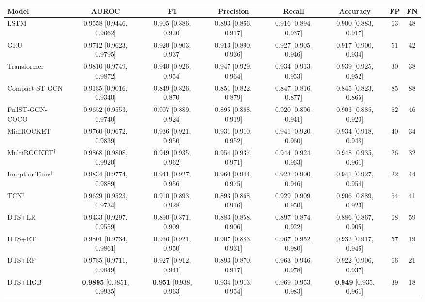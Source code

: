 \begin{table}[t]
\centering
\small
\setlength{\tabcolsep}{1.8pt}
\begin{tabular}{lccccccc}
\toprule
Model & AUROC & F1 & Precision & Recall & Accuracy & FP & FN \\
\midrule
LSTM & 0.9558 [0.9446, 0.9662] & 0.905 [0.886, 0.920] & 0.893 [0.866, 0.917] & 0.916 [0.894, 0.937] & 0.900 [0.883, 0.917] & 63 & 48 \\
GRU & 0.9712 [0.9623, 0.9795] & 0.920 [0.903, 0.937] & 0.913 [0.890, 0.936] & 0.927 [0.905, 0.946] & 0.917 [0.900, 0.934] & 51 & 42 \\
Transformer & 0.9810 [0.9749, 0.9872] & 0.940 [0.926, 0.954] & 0.947 [0.929, 0.964] & 0.934 [0.913, 0.953] & 0.939 [0.925, 0.952] & 30 & 38 \\
Compact ST-GCN & 0.9185 [0.9016, 0.9340] & 0.849 [0.826, 0.870] & 0.851 [0.822, 0.879] & 0.847 [0.816, 0.877] & 0.845 [0.823, 0.865] & 85 & 88 \\
FullST-GCN-COCO & 0.9652 [0.9553, 0.9740] & 0.907 [0.889, 0.924] & 0.895 [0.868, 0.919] & 0.920 [0.896, 0.941] & 0.903 [0.885, 0.920] & 62 & 46 \\
MiniROCKET & 0.9760 [0.9672, 0.9839] & 0.936 [0.921, 0.950] & 0.931 [0.910, 0.952] & 0.941 [0.920, 0.960] & 0.934 [0.918, 0.948] & 40 & 34 \\
MultiROCKET$^{\dagger}$ & 0.9868 [0.9808, 0.9920] & 0.949 [0.935, 0.962] & 0.954 [0.937, 0.971] & 0.944 [0.924, 0.963] & 0.948 [0.935, 0.961] & 26 & 32 \\
InceptionTime$^{\dagger}$ & 0.9834 [0.9774, 0.9889] & 0.941 [0.927, 0.956] & 0.960 [0.944, 0.975] & 0.923 [0.900, 0.946] & 0.941 [0.927, 0.954] & 22 & 44 \\
TCN$^{\dagger}$ & 0.9629 [0.9523, 0.9734] & 0.910 [0.893, 0.928] & 0.893 [0.868, 0.916] & 0.929 [0.909, 0.950] & 0.906 [0.889, 0.923] & 64 & 41 \\
\midrule
DTS+LR & 0.9433 [0.9297, 0.9559] & 0.890 [0.871, 0.909] & 0.883 [0.858, 0.906] & 0.897 [0.874, 0.922] & 0.886 [0.867, 0.905] & 68 & 59 \\
DTS+ET & 0.9801 [0.9734, 0.9861] & 0.936 [0.921, 0.950] & 0.907 [0.883, 0.931] & 0.967 [0.952, 0.980] & 0.932 [0.917, 0.946] & 57 & 19 \\
DTS+RF & 0.9785 [0.9711, 0.9849] & 0.927 [0.912, 0.941] & 0.893 [0.870, 0.917] & 0.963 [0.946, 0.978] & 0.922 [0.906, 0.937] & 66 & 21 \\
DTS+HGB & \textbf{0.9895} [0.9851, 0.9935] & \textbf{0.951} [0.938, 0.963] & 0.934 [0.913, 0.954] & 0.969 [0.953, 0.983] & \textbf{0.949} [0.935, 0.961] & 39 & 18 \\

\end{tabular}
\end{table}
